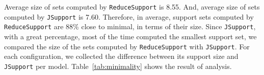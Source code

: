 Average size of sets computed by \texttt{ReduceSupport} is 8.55. And, average size of sets computed by \texttt{JSupport} is 7.60. Therefore, in average, support sets computed by \texttt{ReduceSupport} are 88\% close to minimal, in terms of their size.  %
Since \texttt{JSupport}, with a great percentage, most of the time computed the smallest support set, we compared the size of the sets computed by \texttt{ReduceSupport} with \texttt{JSupport}. For each configuration, we collected the difference between its support size and \texttt{JSupport} per model. Table~\ref{tab:minimality} shows the result of analysis.

